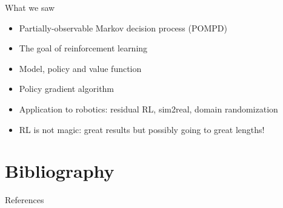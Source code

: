 \documentclass[11pt, aspectratio=169]{beamer}
\begin{document}
\begin{frame}{What we saw}
    \begin{itemize}
        \item Partially-observable Markov decision process (POMPD)
        \item The goal of reinforcement learning
        \item Model, policy and value function
        \item Policy gradient algorithm
        \item Application to robotics: residual RL, sim2real, domain randomization
        \item RL is not magic: great results but possibly going to great lengths!
    \end{itemize}
\end{frame}

\section*{Bibliography}

\renewcommand*{\bibfont}{\footnotesize}
\begin{frame}[allowframebreaks]{References}
    \printbibliography[heading=none]
\end{frame}
\end{document}
